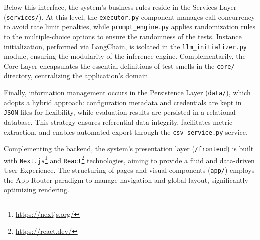 \documentclass[sigconf]{acmart}
\begin{document}
Below this interface, the system's business rules reside in the Services Layer (\texttt{services/}). At this level, the \texttt{executor.py} component manages call concurrency to avoid rate limit penalties, while \texttt{prompt\_engine.py} applies randomization rules to the multiple-choice options to ensure the randomness of the tests. Instance initialization, performed via LangChain, is isolated in the \texttt{llm\_\allowbreak initializer.py} module, ensuring the modularity of the inference engine. Complementarily, the Core Layer encapsulates the essential definitions of test smells in the \texttt{core/} directory, centralizing the application's domain.

Finally, information management occurs in the Persistence Layer (\texttt{data/}), which adopts a hybrid approach: configuration metadata and credentials are kept in \texttt{JSON} files for flexibility, while evaluation results are persisted in a relational database. This strategy ensures referential data integrity, facilitates metric extraction, and enables automated export through the \texttt{csv\_service.py} service.


Complementing the backend, the system's presentation layer (\texttt{/frontend}) is built with \texttt{Next.js}\footnote{\url{https://nextjs.org/}} and \texttt{React}\footnote{\url{https://react.dev/}} technologies, aiming to provide a fluid and data-driven User Experience. The structuring of pages and visual components (\texttt{app/}) employs the App Router paradigm to manage navigation and global layout, significantly optimizing rendering.
\end{document}
